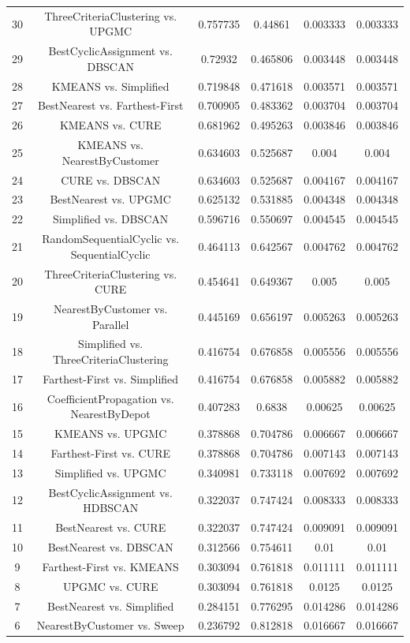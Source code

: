 \documentclass[a4paper,10pt]{article}
\begin{document}
\begin{landscape}
\begin{table}[!htp]
\begin{tabular}{cccccc}
30&ThreeCriteriaClustering vs. UPGMC&0.757735&0.44861&0.003333&0.003333\\
29&BestCyclicAssignment vs. DBSCAN&0.72932&0.465806&0.003448&0.003448\\
28&KMEANS vs. Simplified&0.719848&0.471618&0.003571&0.003571\\
27&BestNearest vs. Farthest-First&0.700905&0.483362&0.003704&0.003704\\
26&KMEANS vs. CURE&0.681962&0.495263&0.003846&0.003846\\
25&KMEANS vs. NearestByCustomer&0.634603&0.525687&0.004&0.004\\
24&CURE vs. DBSCAN&0.634603&0.525687&0.004167&0.004167\\
23&BestNearest vs. UPGMC&0.625132&0.531885&0.004348&0.004348\\
22&Simplified vs. DBSCAN&0.596716&0.550697&0.004545&0.004545\\
21&RandomSequentialCyclic vs. SequentialCyclic&0.464113&0.642567&0.004762&0.004762\\
20&ThreeCriteriaClustering vs. CURE&0.454641&0.649367&0.005&0.005\\
19&NearestByCustomer vs. Parallel&0.445169&0.656197&0.005263&0.005263\\
18&Simplified vs. ThreeCriteriaClustering&0.416754&0.676858&0.005556&0.005556\\
17&Farthest-First vs. Simplified&0.416754&0.676858&0.005882&0.005882\\
16&CoefficientPropagation vs. NearestByDepot&0.407283&0.6838&0.00625&0.00625\\
15&KMEANS vs. UPGMC&0.378868&0.704786&0.006667&0.006667\\
14&Farthest-First vs. CURE&0.378868&0.704786&0.007143&0.007143\\
13&Simplified vs. UPGMC&0.340981&0.733118&0.007692&0.007692\\
12&BestCyclicAssignment vs. HDBSCAN&0.322037&0.747424&0.008333&0.008333\\
11&BestNearest vs. CURE&0.322037&0.747424&0.009091&0.009091\\
10&BestNearest vs. DBSCAN&0.312566&0.754611&0.01&0.01\\
9&Farthest-First vs. KMEANS&0.303094&0.761818&0.011111&0.011111\\
8&UPGMC vs. CURE&0.303094&0.761818&0.0125&0.0125\\
7&BestNearest vs. Simplified&0.284151&0.776295&0.014286&0.014286\\
6&NearestByCustomer vs. Sweep&0.236792&0.812818&0.016667&0.016667\\

\end{tabular}
\end{table}
\end{landscape}
\end{document}
